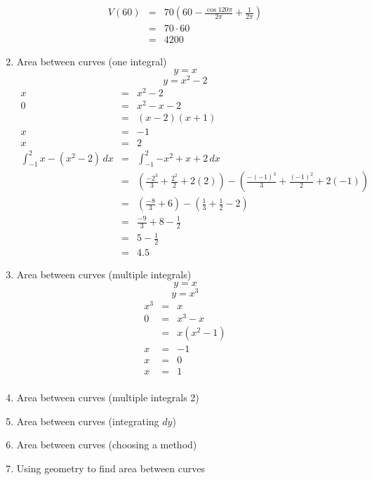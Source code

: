 \documentclass{article}
\begin{document}
\begin{enumerate}
\begin{eqnarray}
            V(60) &=& 70\left(60 - \frac{\cos{120\pi}}{2\pi} + \frac{1}{2\pi}\right) \\
                  &=& 70 \cdot 60 \\
                  &=& 4200
        \end{eqnarray}
    \item Area between curves (one integral)
        $$y = x$$
        $$y = x^2 - 2$$
        \begin{eqnarray}
            x &=& x^2 - 2 \\
            0 &=& x^2 - x - 2 \\
              &=& \left(x-2\right)\left(x+1\right) \\
            x &=& -1 \\
            x &=& 2 \\
            \int_{-1}^2{x - \left(x^2 - 2\right)\,dx} &=& \int_{-1}^2{-x^2 + x + 2\,dx} \\
                                                      &=& \left(\frac{-2^3}{3} + \frac{2^2}{2} + 2(2)\right) - \left(\frac{-(-1)^3}{3} + \frac{(-1)^2}{2} + 2(-1)\right) \\
                                                      &=& \left(\frac{-8}{3} + 6\right) - \left(\frac{1}{3} + \frac{1}{2} - 2\right) \\
                                                      &=& \frac{-9}{3} + 8  - \frac{1}{2} \\
                                                      &=& 5 - \frac{1}{2} \\
                                                      &=& 4.5
        \end{eqnarray}
    \item Area between curves (multiple integrals)
        $$y = x$$
        $$y = x^3$$
        \begin{eqnarray}
            x^3 &=& x \\
            0 &=& x^3 - x \\
              &=& x\left(x^2 - 1\right) \\
            x &=& -1 \\
            x &=& 0 \\
            x &=& 1 \\
        \end{eqnarray}
    \item Area between curves (multiple integrals 2)
    \item Area between curves (integrating $dy$)
    \item Area between curves (choosing a method)
    \item Using geometry to find area between curves
\end{enumerate}
\end{document}
